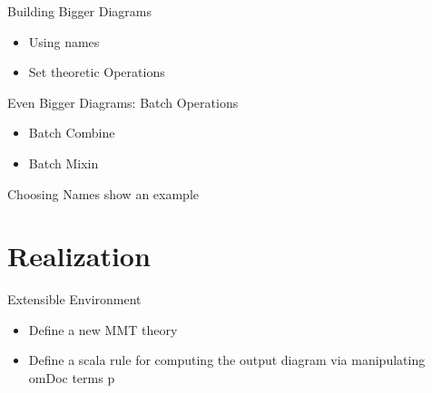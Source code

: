 \documentclass[t,12pt,numbers,fleqn,usenames,xcolor=dvipsnames]{beamer}
\begin{document}
\begin{frame}[fragile]{Building Bigger Diagrams}
\begin{itemize}
	\item Using names  
	\item Set theoretic Operations 
\end{itemize}
\end{frame}

\begin{frame}[fragile]{Even Bigger Diagrams: Batch Operations}
\begin{itemize}
	\item Batch Combine 
	\item Batch Mixin 
\end{itemize}
\end{frame}

\begin{frame}[fragile]{Choosing Names}
show an example 
\end{frame}

\section{Realization}
\begin{frame}[fragile]{Extensible Environment}
\begin{itemize}
	\item Define a new MMT theory 
	\item Define a scala rule for computing the output diagram via manipulating omDoc terms p
\end{itemize}
\end{frame}
\end{document}
